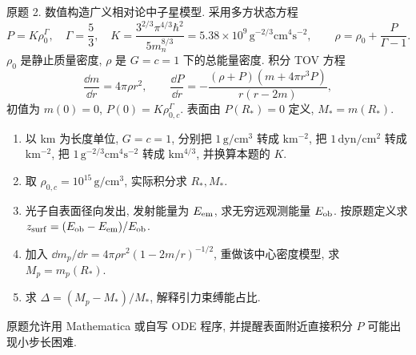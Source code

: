 \begin{exercise}\label{ps:10.2}
原题 2. 数值构造广义相对论中子星模型. 采用多方状态方程
\[
P=K\rho_0^\Gamma,\quad \Gamma=\frac53,\quad
K=\frac{3^{2/3}\pi^{4/3}\hbar^2}{5m_n^{8/3}}
=5.38\times10^9\,\mathrm{g^{-2/3}cm^4s^{-2}},\qquad
\rho=\rho_0+\frac{P}{\Gamma-1}.
\]
$\rho_0$ 是静止质量密度, $\rho$ 是 $G=c=1$ 下的总能量密度. 积分 TOV 方程
\[
\frac{\dd m}{\dd r}=4\pi\rho r^2,\qquad
\frac{\dd P}{\dd r}=-\frac{(\rho+P)(m+4\pi r^3P)}{r(r-2m)},
\]
初值为 $m(0)=0$, $P(0)=K\rho_{0,c}^\Gamma$. 表面由 $P(R_*)=0$ 定义, $M_*=m(R_*)$.
\begin{enumerate}[label=(\alph*)]
\item 以 km 为长度单位, $G=c=1$, 分别把 $1\,\mathrm{g/cm^3}$ 转成 $\mathrm{km^{-2}}$, 把 $1\,\mathrm{dyn/cm^2}$ 转成 $\mathrm{km^{-2}}$, 把 $1\,\mathrm{g^{-2/3}cm^4s^{-2}}$ 转成 $\mathrm{km^{4/3}}$, 并换算本题的 $K$.
\item 取 $\rho_{0,c}=10^{15}\,\mathrm{g/cm^3}$, 实际积分求 $R_*,M_*$.
\item 光子自表面径向发出, 发射能量为 $E_{\rm em}$, 求无穷远观测能量 $E_{\rm ob}$. 按原题定义求 $z_{\rm surf}=(E_{\rm ob}-E_{\rm em})/E_{\rm ob}$.
\item 加入 $\dd m_p/\dd r=4\pi\rho r^2(1-2m/r)^{-1/2}$, 重做该中心密度模型, 求 $M_p=m_p(R_*)$.
\item 求 $\Delta=(M_p-M_*)/M_*$, 解释引力束缚能占比.
\end{enumerate}
原题允许用 Mathematica 或自写 ODE 程序, 并提醒表面附近直接积分 $P$ 可能出现小步长困难.
\end{exercise}
